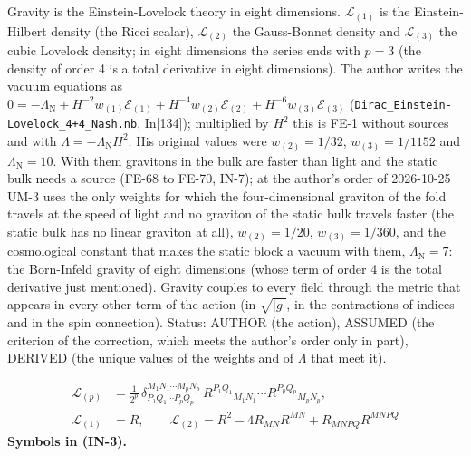 \documentclass[
  10pt,
]{article}
\begin{document}
Gravity is the Einstein-Lovelock theory in eight dimensions.
\(\mathcal{L}_{(1)}\) is the Einstein-Hilbert density (the Ricci
scalar), \(\mathcal{L}_{(2)}\) the Gauss-Bonnet density and
\(\mathcal{L}_{(3)}\) the cubic Lovelock density; in eight dimensions
the series ends with \(p = 3\) (the density of order 4 is a total
derivative in eight dimensions). The author writes the vacuum equations
as
\(0 = -\Lambda_{\mathrm{N}} + H^{-2}w_{(1)}\mathcal{E}_{(1)} + H^{-4}w_{(2)}\mathcal{E}_{(2)} + H^{-6}w_{(3)}\mathcal{E}_{(3)}\)
(\texttt{Dirac\_Einstein-Lovelock\_4+4\_Nash.nb}, In{[}134{]});
multiplied by \(H^2\) this is FE-1 without sources and with
\(\Lambda = -\Lambda_{\mathrm{N}}H^2\). His original values were
\(w_{(2)} = 1/32\), \(w_{(3)} = 1/1152\) and
\(\Lambda_{\mathrm{N}} = 10\). With them gravitons in the bulk are
faster than light and the static bulk needs a source (FE-68 to FE-70,
IN-7); at the author's order of 2026-10-25 UM-3 uses the only weights
for which the four-dimensional graviton of the fold travels at the speed
of light and no graviton of the static bulk travels faster (the static
bulk has no linear graviton at all), \(w_{(2)} = 1/20\),
\(w_{(3)} = 1/360\), and the cosmological constant that makes the static
block a vacuum with them, \(\Lambda_{\mathrm{N}} = 7\): the Born-Infeld
gravity of eight dimensions (whose term of order 4 is the total
derivative just mentioned). Gravity couples to every field through the
metric that appears in every other term of the action (in
\(\sqrt{\lvert g\rvert}\), in the contractions of indices and in the
spin connection). Status: AUTHOR (the action), ASSUMED (the criterion of
the correction, which meets the author's order only in part), DERIVED
(the unique values of the weights and of \(\Lambda\) that meet it).

\[
\begin{aligned}
\mathcal{L}_{(p)} &= \frac{1}{2^{p}}\,\delta^{M_1N_1\cdots M_pN_p}_{P_1Q_1\cdots P_pQ_p}\,
 R^{P_1Q_1}{}_{M_1N_1}\cdots R^{P_pQ_p}{}_{M_pN_p},\\
\mathcal{L}_{(1)} &= R,\qquad \mathcal{L}_{(2)} = R^2 - 4R_{MN}R^{MN} + R_{MNPQ}R^{MNPQ}
\end{aligned} \tag{IN-3}
\] \textbf{Symbols in (IN-3).}
\end{document}
